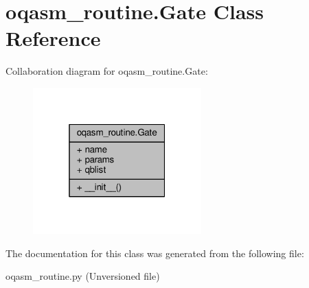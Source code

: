 \hypertarget{classoqasm__routine_1_1Gate}{\section{oqasm\-\_\-routine.\-Gate Class Reference}
\label{classoqasm__routine_1_1Gate}
}


Collaboration diagram for oqasm\-\_\-routine.\-Gate\-:
\nopagebreak
\begin{figure}[H]
\begin{center}
\leavevmode
\includegraphics[width=184pt]{da/de3/classoqasm__routine_1_1Gate__coll__graph}
\end{center}
\end{figure}


The documentation for this class was generated from the following file\-:\begin{DoxyCompactItemize}
\item 
oqasm\-\_\-routine.\-py (\-Unversioned file)\end{DoxyCompactItemize}
